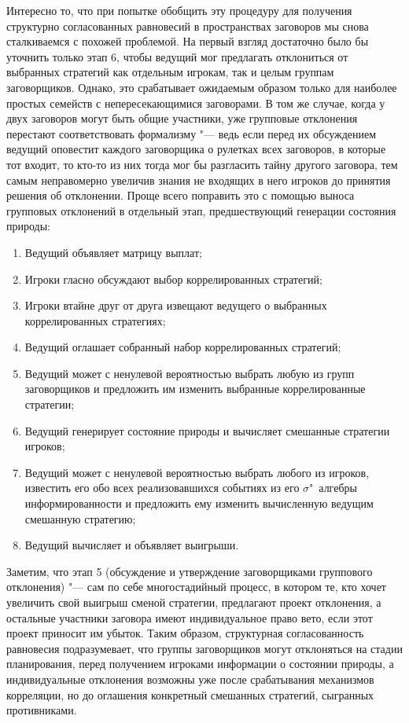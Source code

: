 Интересно то, что при попытке обобщить эту процедуру для получения структурно согласованных равновесий в пространствах заговоров мы снова сталкиваемся с похожей проблемой. На первый взгляд достаточно было бы уточнить только этап 6, чтобы ведущий мог предлагать отклониться от выбранных стратегий как отдельным игрокам, так и целым группам заговорщиков. Однако, это срабатывает ожидаемым образом только для наиболее простых семейств с непересекающимися заговорами. В том же случае, когда у двух заговоров могут быть общие участники, уже групповые отклонения перестают соответствовать формализму "--- ведь если перед их обсуждением ведущий оповестит каждого заговорщика о рулетках всех заговоров, в которые тот входит, то кто-то из них тогда мог бы разгласить тайну другого заговора, тем самым неправомерно увеличив знания не входящих в него игроков до принятия решения об отклонении. Проще всего поправить это с помощью выноса групповых отклонений в отдельный этап, предшествующий генерации состояния природы:

\begin{enumerate}
	\item Ведущий объявляет матрицу выплат;
	\item Игроки гласно обсуждают выбор коррелированных стратегий;
	\item Игроки втайне друг от друга извещают ведущего о выбранных коррелированных стратегиях;
	\item Ведущий оглашает собранный набор коррелированных стратегий;
	\item Ведущий может с ненулевой вероятностью выбрать любую из групп заговорщиков и предложить им изменить выбранные коррелированные стратегии;
	\item Ведущий генерирует состояние природы и вычисляет смешанные стратегии игроков;
	\item Ведущий может с ненулевой вероятностью выбрать любого из игроков, известить его обо всех реализовавшихся событиях из его $\sigma$"~алгебры информированности и предложить ему изменить вычисленную ведущим смешанную стратегию;
	\item Ведущий вычисляет и объявляет выигрыши.
\end{enumerate}

Заметим, что этап 5 (обсуждение и утверждение заговорщиками группового отклонения) "--- сам по себе многостадийный процесс, в котором те, кто хочет увеличить свой выигрыш сменой стратегии, предлагают проект отклонения, а остальные участники заговора имеют индивидуальное право вето, если этот проект приносит им убыток. Таким образом, структурная согласованность равновесия подразумевает, что группы заговорщиков могут отклоняться на стадии планирования, перед получением игроками информации о состоянии природы, а индивидуальные отклонения возможны уже после срабатывания механизмов корреляции, но до оглашения конкретный смешанных стратегий, сыгранных противниками.

